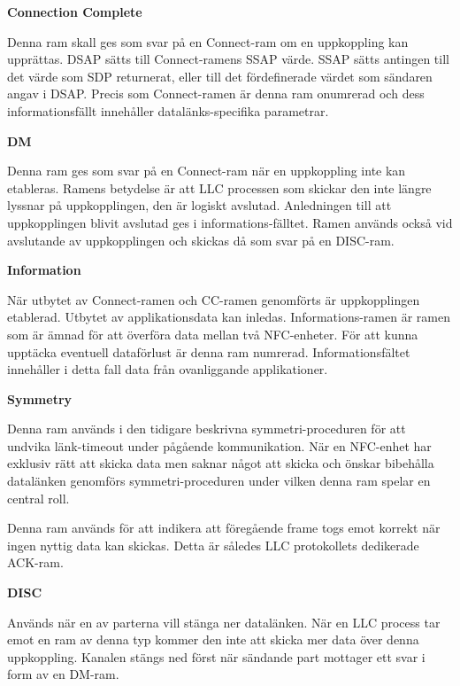 \documentclass[11pt]{article}
\begin{document}
\textbf{Connection Complete}


Denna ram skall ges som svar på en Connect-ram om en uppkoppling kan upprättas. DSAP sätts till Connect-ramens SSAP värde. SSAP sätts antingen till det värde som SDP returnerat, eller till det fördefinerade värdet som sändaren angav i DSAP. Precis som Connect-ramen är denna ram onumrerad och dess informationsfällt innehåller datalänks-specifika parametrar.

\textbf{DM}


Denna ram ges som svar på en Connect-ram när en uppkoppling inte kan etableras. Ramens betydelse är att LLC processen som skickar den inte längre lyssnar på uppkopplingen, den är logiskt avslutad. Anledningen till att uppkopplingen blivit avslutad ges i informations-fälltet. Ramen används också vid avslutande av uppkopplingen och skickas då som svar på en DISC-ram.

\textbf{Information}


När utbytet av Connect-ramen och CC-ramen genomförts är uppkopplingen etablerad. Utbytet av applikationsdata kan inledas. Informations-ramen är ramen som är ämnad för att överföra data mellan två NFC-enheter. För att kunna upptäcka eventuell dataförlust är denna ram numrerad. Informationsfältet innehåller i detta fall data från ovanliggande applikationer.

\textbf{Symmetry}


Denna ram används i den tidigare beskrivna symmetri-proceduren för att undvika länk-timeout under pågående kommunikation. När en NFC-enhet har exklusiv rätt att skicka data men saknar något att skicka och önskar bibehålla datalänken genomförs symmetri-proceduren under vilken denna ram spelar en central roll.


Denna ram används för att indikera att föregående frame togs emot korrekt när ingen nyttig data kan skickas. Detta är således LLC protokollets dedikerade ACK-ram.

\textbf{DISC}


Används när en av parterna vill stänga ner datalänken. När en LLC process tar emot en ram av denna typ kommer den inte att skicka mer data över denna uppkoppling. Kanalen stängs ned först när sändande part mottager ett svar i form av en DM-ram.
\end{document}

